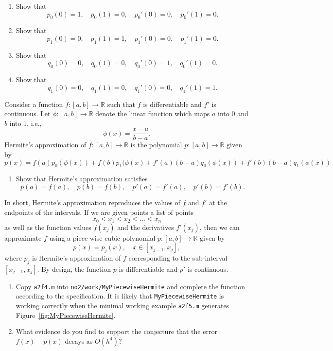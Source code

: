 \documentclass[a4paper,12pt]{article}
\newcommand{\R}{\mathbb{R}}
\newcommand{\bes}{\begin{equation*}}
\newcommand{\ees}{\end{equation*}}
\newcommand{\be}{\begin{equation}}
\newcommand{\ee}{\end{equation}}
\begin{document}
 \begin{enumerate}
 \item Show that
   \be
   p_0(0) = 1, \quad p_0(1) = 0, \quad p_0'(0) = 0, \quad p_0'(1) = 0.
   \ee
 \item Show that
   \be
   p_1(0) = 0, \quad p_1(1) = 1, \quad p_1'(0) = 0, \quad p_1'(1) = 0.
   \ee
  \item Show that
   \be
   q_0(0) = 0, \quad q_0(1) = 0, \quad q_0'(0) = 1, \quad q_0'(1) = 0.
   \ee
 \item Show that
   \be
   q_1(0) = 0, \quad q_1(1) = 0, \quad q_1'(0) = 0, \quad q_1'(1) = 1.
   \ee
 \end{enumerate}
 Consider a function $f : [a,b] \rightarrow \R$ such that $f$ is differentiable and $f'$ is continuous. Let $\phi : [a,b] \rightarrow \R$ denote the linear function which maps $a$ into $0$ and $b$ into $1$, i.e.,
 \be
 \phi(x) = \frac{x - a}{b-a}.
 \ee
 Hermite's approximation of $f : [a,b] \rightarrow \R$ is the polynomial $p : [a,b] \rightarrow \R$ given by
 \be
 p(x)  = f(a) p_0(\phi(x)) + f(b) p_1(\phi(x) + f'(a) (b-a) q_0(\phi(x)) + f'(b) (b-a) q_1(\phi(x))
 \ee
 \begin{enumerate}[resume]
 \item Show that Hermite's approximation satisfies
   \be
   p(a) = f(a), \quad p(b) = f(b), \quad p'(a) = f'(a), \quad p'(b) = f'(b).
   \ee
 \end{enumerate}
 In short, Hermite's approximation reproduces the values of $f$ and $f'$ at the endpoints of the intervals. If we are given points a list of points
 \bes
 x_0 < x_1 < x_2 < \dots < x_n
 \ees
 as well as the function values $f(x_j)$ and the derivatives $f'(x_j)$, then we can approximate $f$ using a piece-wise cubic polynomial $p : [a,b] \rightarrow \R$ given by
 \be
 p(x) = p_j(x), \quad x \in [x_{j-1},x_j],
 \ee
 where $p_j$ is Hermite's approximation of $f$ corresponding to the sub-interval $[x_{j-1}, x_j]$. By design, the function $p$ is differentiable and $p'$ is continuous.
\begin{enumerate}[resume] 
 \item Copy {\tt a2f4.m} into {\tt no2/work/MyPiecewiseHermite} and complete the function according to the specification. It is likely that {\tt MyPiecewiseHermite} is working correctly when the minimal working example {\tt a2f5.m} generates Figure~\ref{fig:MyPiecewiseHermite}.

 \item What evidence do you find to support the conjecture that the error $f(x) - p(x)$ decays as $O(h^4)$?
 \end{enumerate}
\end{document}
